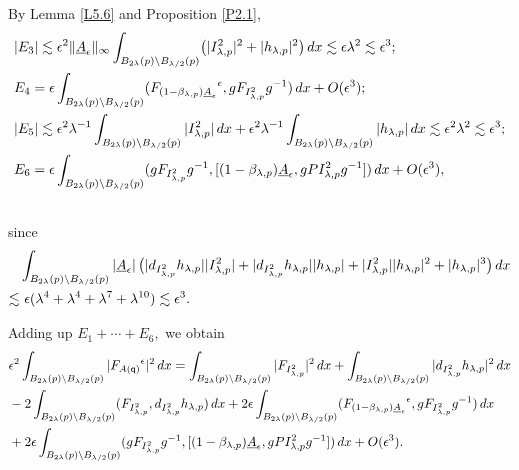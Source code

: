 \documentclass[11pt]{article}
\numberwithin{equation}{section} \setlength{\topmargin}{-35pt}
\newcommand{\q}{\mathsf{q}}
\begin{document}
\noindent By Lemma \ref{L5.6} and Proposition \ref{P2.1},
\begin{align}
\notag & |E_3|\lesssim \epsilon^2 \Vert \underline
A_\epsilon\Vert_\infty \int_{B_{2\lambda}(p)\setminus
B_{\lambda/2}(p)} \bigl(|I^2_{\lambda,p}|^2+
|h_{\lambda,p}|^2\bigr)\,dx\lesssim
\epsilon\lambda^2\lesssim \epsilon^3;\notag\\
&E_4= \epsilon\int_{B_{2\lambda}(p)\setminus
B_{\lambda/2}(p)}({F_{(1-\beta_{\lambda,p})\underline{A}_{\epsilon}}}^{\epsilon},gF_{I^2_{\lambda,p}}g^{-1})\,dx+O(\epsilon^3);\notag\\
&|E_5|\lesssim\epsilon^2\lambda^{-1}\int_{B_{2\lambda}(p)\setminus
B_{\lambda/2}(p)}
|I^2_{\lambda,p}|\,dx+\epsilon^2\lambda^{-1}\int_{B_{2\lambda}(p)\setminus
B_{\lambda/2}(p)}|h_{\lambda,p}|\,dx
\lesssim\epsilon^2\lambda^2\lesssim\epsilon^3;\notag\\
&E_6=\epsilon\int_{B_{2\lambda}(p)\setminus
B_{\lambda/2}(p)}(gF_{I^2_{\lambda,p}}g^{-1},[(1-\beta_{\lambda,p})\underline
A_{\epsilon},gPI^2_{\lambda,p}g^{-1}])\,dx+O(\epsilon^3),\notag\\
\notag
\end{align}
\noindent since
\begin{align}
&\int_{B_{2\lambda}(p)\setminus B_{\lambda/2}(p)}|\underline
A_\epsilon|\,\bigl(
|d_{I^2_{\lambda,p}}h_{\lambda,p}||I^2_{\lambda,p}| +
|d_{I^2_{\lambda,p}}h_{\lambda,p}||h_{\lambda,p}|+|I^2_{\lambda,p}||h_{\lambda,p}|^2
+ |h_{\lambda,p}|^3\bigr)\,dx\notag\\
\lesssim&~\epsilon(\lambda^4+\lambda^4+\lambda^7+\lambda^{10})\lesssim\epsilon^3.
\notag
\end{align}


\noindent Adding up $E_1+\cdots+E_6,$ we obtain
\begin{align}
\label{YM2-I} &\epsilon^2\int_{B_{2\lambda}(p)\setminus
B_{\lambda/2}(p)}|{F_{A(\q)}}^{\epsilon}|^2\,dx
=\int_{B_{2\lambda}(p)\setminus
B_{\lambda/2}(p)}|F_{I^2_{\lambda,p}}|^2\,dx+
\int_{B_{2\lambda}(p)\setminus B_{\lambda/2}(p)}|d_{I^2_{\lambda,p}}h_{\lambda,p}|^2\,dx\notag\\
&-2\int_{B_{2\lambda}(p)\setminus
B_{\lambda/2}(p)}(F_{I^2_{\lambda,p}},d_{I^2_{\lambda,p}}h_{\lambda,p})\,dx+
2\epsilon\int_{B_{2\lambda}(p)\setminus B_{\lambda/2}(p)}({F_{(1-\beta_{\lambda,p})\underline{A}_{\epsilon}}}^{\epsilon},gF_{I^2_{\lambda,p}}g^{-1})\,dx\notag\\
&+2\epsilon\int_{B_{2\lambda}(p)\setminus
B_{\lambda/2}(p)}(gF_{I^2_{\lambda,p}}g^{-1},[(1-\beta_{\lambda,p})\underline{A}_{\epsilon},gPI^2_{\lambda,p}g^{-1}])
\,dx+O(\epsilon^3).
\end{align}
\end{document}
